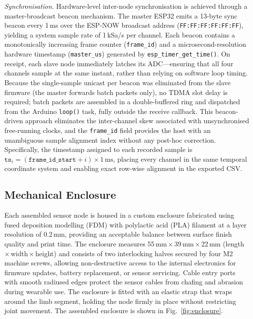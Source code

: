 \textit{Synchronisation.} Hardware-level inter-node synchronisation is achieved through a master-broadcast beacon mechanism. The master ESP32 emits a 13-byte sync beacon every 1\,ms over the ESP-NOW broadcast address (\texttt{FF:FF:FF:FF:FF:FF}), yielding a system sample rate of 1\,kSa/s per channel. Each beacon contains a monotonically increasing frame counter (\texttt{frame\_id}) and a microsecond-resolution hardware timestamp (\texttt{master\_us}) generated by \texttt{esp\_timer\_get\_time()}. On receipt, each slave node immediately latches its ADC---ensuring that all four channels sample at the same instant, rather than relying on software loop timing. Because the single-sample unicast per beacon was eliminated from the slave firmware (the master forwards batch packets only), no TDMA slot delay is required; batch packets are assembled in a double-buffered ring and dispatched from the Arduino \texttt{loop()} task, fully outside the receive callback. This beacon-driven approach eliminates the inter-channel skew associated with unsynchronised free-running clocks, and the \texttt{frame\_id} field provides the host with an unambiguous sample alignment index without any post-hoc correction. Specifically, the timestamp assigned to each recorded sample is $\texttt{ts}_{i} = (\texttt{frame\_id\_start} + i) \times 1\,\text{ms}$, placing every channel in the same temporal coordinate system and enabling exact row-wise alignment in the exported CSV.



\subsection{Mechanical Enclosure}

Each assembled sensor node is housed in a custom enclosure fabricated using fused deposition modelling (FDM) with polylactic acid (PLA) filament at a layer resolution of 0.2\,mm, providing an acceptable balance between surface finish quality and print time. The enclosure measures 55\,mm\,$\times$\,39\,mm\,$\times$\,22\,mm (length\,$\times$\,width\,$\times$\,height) and consists of two interlocking halves secured by four M2 machine screws, allowing non-destructive access to the internal electronics for firmware updates, battery replacement, or sensor servicing. Cable entry ports with smooth radiused edges protect the sensor cables from chafing and abrasion during wearable use. The enclosure is fitted with an elastic strap that wraps around the limb segment, holding the node firmly in place without restricting joint movement. The assembled enclosure is shown in Fig.~\ref{fig:enclosure}.

